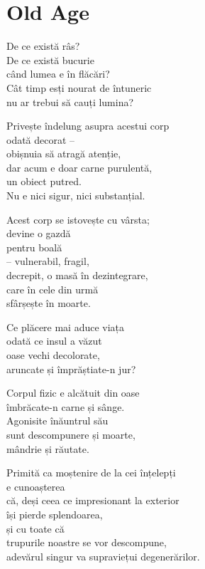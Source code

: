 
\chapter{Old Age}


De ce există râs?\\
De ce există bucurie\\
când lumea e în flăcări?\\
Cât timp esți nourat de întuneric\\
nu ar trebui să cauți lumina?


Privește îndelung asupra acestui corp\\
odată decorat –\\
obișnuia să atragă atenție,\\
dar acum e doar carne purulentă,\\
un obiect putred.\\
Nu e nici sigur, nici substanțial.


Acest corp se istovește cu vârsta;\\
devine o gazdă\\
pentru boală\\
– vulnerabil, fragil,\\
decrepit, o masă în dezintegrare,\\
care în cele din urmă\\
sfârșește în moarte.


Ce plăcere mai aduce viața\\
odată ce insul a văzut\\
oase vechi decolorate,\\
aruncate și împrăștiate-n jur?


Corpul fizic e alcătuit din oase\\
îmbrăcate-n carne și sânge.\\
Agonisite înăuntrul său\\
sunt descompunere și moarte,\\
mândrie și răutate.


Primită ca moștenire de la cei înțelepți\\
e cunoașterea\\
că, deși ceea ce impresionant la exterior\\
își pierde splendoarea,\\
și cu toate că\\
trupurile noastre se vor descompune,\\
adevărul singur va supraviețui degenerărilor.

